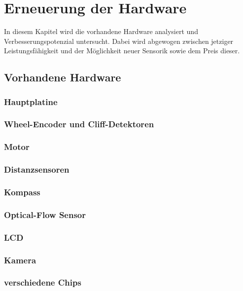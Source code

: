 \documentclass[a4paper,cleardoubleempty,BCOR1cm]{book}
\begin{document}
\section{Erneuerung der Hardware}
In diesem Kapitel wird die vorhandene Hardware analysiert und Verbesserungspotenzial untersucht. Dabei wird abgewogen zwischen jetziger Leistungsfähigkeit und der Möglichkeit neuer Sensorik sowie dem Preis dieser. 

\subsection{Vorhandene Hardware}

\subsubsection{Hauptplatine}

\subsubsection{Wheel-Encoder und Cliff-Detektoren}

\subsubsection{Motor}

\subsubsection{Distanzsensoren}

\subsubsection{Kompass}

\subsubsection{Optical-Flow Sensor}


\subsubsection{LCD}

\subsubsection{Kamera}

\subsubsection{verschiedene Chips}
\end{document}
